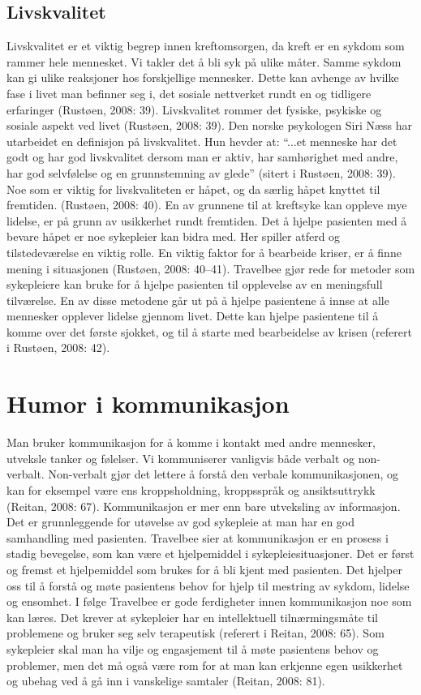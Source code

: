 \subsection{Livskvalitet}

Livskvalitet er et viktig begrep innen kreftomsorgen, da kreft er en sykdom som
rammer hele mennesket. Vi takler det å bli syk på ulike måter. Samme sykdom kan
gi ulike reaksjoner hos forskjellige mennesker. Dette kan avhenge av hvilke
fase i livet man befinner seg i, det sosiale nettverket rundt en og tidligere
erfaringer (Rustøen, 2008: 39).  Livskvalitet rommer det fysiske, psykiske og
sosiale aspekt ved livet (Rustøen, 2008: 39). Den norske psykologen Siri Næss
har utarbeidet en definisjon på livskvalitet. Hun hevder at: “...et menneske
har det godt og har god livskvalitet dersom man er aktiv, har samhørighet med
andre, har god selvfølelse og en grunnstemning av glede” (sitert i Rustøen,
2008: 39). Noe som er viktig for livskvaliteten er håpet, og da særlig håpet
knyttet til fremtiden. (Rustøen, 2008: 40).  En av grunnene til at kreftsyke
kan oppleve mye lidelse, er på grunn av usikkerhet rundt fremtiden. Det å
hjelpe pasienten med å bevare håpet er noe sykepleier kan bidra med. Her
spiller atferd og tilstedeværelse en viktig rolle. En viktig faktor for å
bearbeide kriser, er å finne mening i situasjonen (Rustøen, 2008: 40--41).
Travelbee gjør rede for metoder som sykepleiere kan bruke for å hjelpe
pasienten til opplevelse av en meningsfull tilværelse. En av disse metodene går
ut på å hjelpe pasientene å innse at alle mennesker opplever lidelse gjennom
livet. Dette kan hjelpe pasientene til å komme over det første sjokket, og til
å starte med bearbeidelse av krisen (referert i Rustøen, 2008: 42).

\section{Humor i kommunikasjon}

Man bruker kommunikasjon for å komme i kontakt med andre mennesker, utveksle
tanker og følelser. Vi kommuniserer vanligvis både verbalt og non-verbalt.
Non-verbalt gjør det lettere å forstå den verbale kommunikasjonen, og kan for
eksempel være ens kroppsholdning, kroppsspråk og ansiktsuttrykk (Reitan, 2008:
67).  Kommunikasjon er mer enn bare utveksling av informasjon. Det er
grunnleggende for utøvelse av god sykepleie at man har en god samhandling med
pasienten. Travelbee sier at kommunikasjon er en prosess i stadig bevegelse,
som kan være et hjelpemiddel i sykepleiesituasjoner. Det er først og fremst et
hjelpemiddel som brukes for å bli kjent med pasienten. Det hjelper oss til å
forstå og møte pasientens behov for hjelp til mestring av sykdom, lidelse og
ensomhet. I følge Travelbee er gode ferdigheter innen kommunikasjon noe som kan
læres. Det krever at sykepleier har en intellektuell tilnærmingsmåte til
problemene og bruker seg selv terapeutisk (referert i Reitan, 2008: 65). Som
sykepleier skal man ha vilje og engasjement til å møte pasientens behov og
problemer, men det må også være rom for at man kan erkjenne egen usikkerhet og
ubehag ved å gå inn i vanskelige samtaler (Reitan, 2008: 81).


